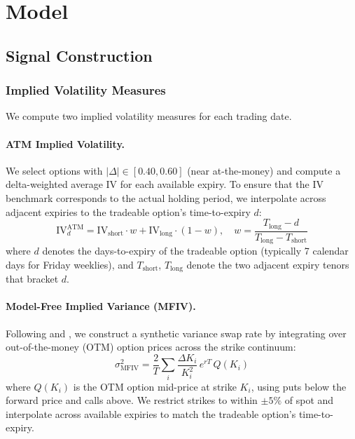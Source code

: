 \documentclass[11pt,a4paper]{article}
\begin{document}
\section{Model}

\subsection{Signal Construction}

\subsubsection{Implied Volatility Measures}

We compute two implied volatility measures for each trading date.

\paragraph{ATM Implied Volatility.}
We select options with $|\Delta| \in [0.40, 0.60]$ (near at-the-money) and compute a delta-weighted average IV for each available expiry.
To ensure that the IV benchmark corresponds to the actual holding period, we interpolate across adjacent expiries to the tradeable option's time-to-expiry $d$:
\begin{equation}
    \text{IV}_d^{\text{ATM}} = \text{IV}_{\text{short}} \cdot w + \text{IV}_{\text{long}} \cdot (1 - w), \quad w = \frac{T_{\text{long}} - d}{T_{\text{long}} - T_{\text{short}}}
\end{equation}
where $d$ denotes the days-to-expiry of the tradeable option (typically 7 calendar days for Friday weeklies), and $T_{\text{short}}$, $T_{\text{long}}$ denote the two adjacent expiry tenors that bracket $d$.

\paragraph{Model-Free Implied Variance (MFIV).}
Following \citet{carr1998towards} and \citet{demeterfi1999more}, we construct a synthetic variance swap rate by integrating over out-of-the-money (OTM) option prices across the strike continuum:
\begin{equation}
    \sigma^2_{\text{MFIV}} = \frac{2}{T} \sum_i \frac{\Delta K_i}{K_i^2}\, e^{rT}\, Q(K_i) \label{eq:mfiv}
\end{equation}
where $Q(K_i)$ is the OTM option mid-price at strike $K_i$, using puts below the forward price and calls above.
We restrict strikes to within $\pm 5\%$ of spot and interpolate across available expiries to match the tradeable option's time-to-expiry.
\end{document}
